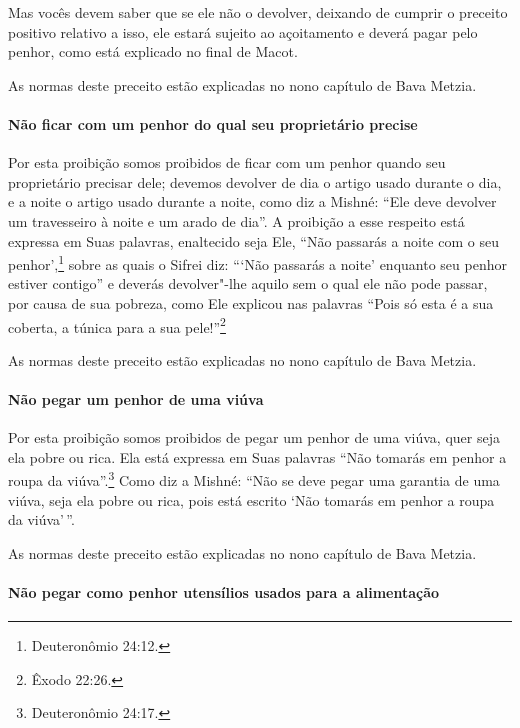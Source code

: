 \begin{multicols}{2}
Mas vocês devem saber que se ele não o devolver, deixando de cumprir o
preceito positivo relativo a isso, ele estará sujeito ao açoitamento e
deverá pagar pelo penhor, como está explicado no final de Macot\starr.

As normas deste preceito estão explicadas no nono capítulo de Bava Metzia\starr.

\paragraph{Não ficar com um penhor do qual seu proprietário precise}

Por esta proibição somos proibidos de ficar com um penhor quando seu
proprietário precisar dele; devemos devolver de dia o artigo usado
durante o dia, e a noite o artigo usado durante a noite, como diz a
Mishné: ``Ele deve devolver um travesseiro à noite e um arado de dia''.
A proibição a esse respeito está expressa em Suas palavras, enaltecido
seja Ele, ``Não passarás a noite com o seu penhor',\footnote{Deuteronômio
24:12.} sobre as quais o Sifrei\starr{} diz: ```Não passarás a noite' enquanto
seu penhor estiver contigo'' e deverás devolver"-lhe aquilo sem o qual
ele não pode passar, por causa de sua pobreza, como Ele explicou nas
palavras ``Pois só esta é a sua coberta, a túnica para a sua pele!''\footnote{Êxodo 22:26.}

As normas deste preceito estão explicadas no nono capítulo de Bava Metzia\starr.

\paragraph{Não pegar um penhor de uma viúva}

Por esta proibição somos proibidos de pegar um penhor de uma viúva,
quer seja ela pobre ou rica. Ela está expressa em Suas palavras ``Não
tomarás em penhor a roupa da viúva''.\footnote{Deuteronômio 24:17.} Como diz a
Mishné: ``Não se deve pegar uma garantia de uma viúva, seja ela pobre ou
rica, pois está escrito `Não tomarás em penhor a roupa da viúva'\,''.

As normas deste preceito estão explicadas no nono capítulo de Bava Metzia\starr.

\paragraph{Não pegar como penhor utensílios usados para a alimentação}


\end{multicols}
